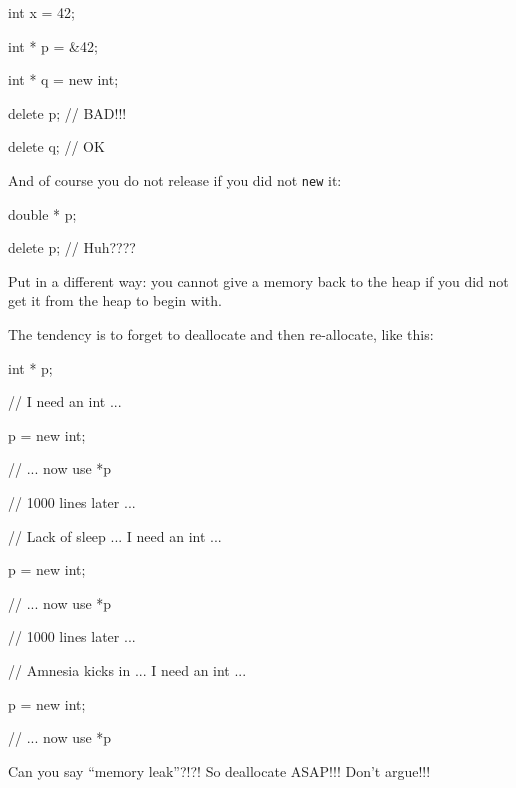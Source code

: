 \begin{consolethree}[escapeinside=||]
int x = 42;

int * p = &42;

int * q = new int;

delete p; // BAD!!!

delete q; // OK
\end{consolethree}
And of course you do not release if you did not \texttt{new} it:

\begin{consolethree}[escapeinside=||]
double * p;

delete p; // Huh????
\end{consolethree}
Put in a different way: you cannot give a memory back to the heap if you did not get it from the heap to begin with.

The tendency is to forget to deallocate and then re-allocate, like this:

\begin{consolethree}[escapeinside=||]
int * p;

// I need an int ...

p = new int;

// ... now use *p

// 1000 lines later ...

// Lack of sleep ... I need an int ...

p = new int;

// ... now use *p

// 1000 lines later ...

// Amnesia kicks in ... I need an int ...

p = new int;

// ... now use *p
\end{consolethree}
Can you say ``memory leak''?!?! So deallocate ASAP!!! Don't argue!!!

